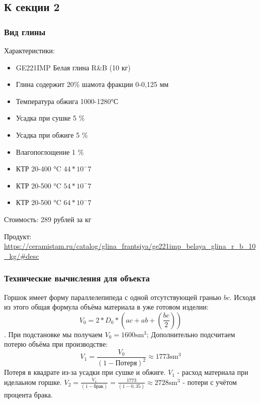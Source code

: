 \documentclass[16pt,a4paper]{article}
\begin{document}
\subsection{К секции 2}
\subsubsection{Вид глины} \label{sec:at1}
Характеристики:
\begin{itemize}
    \item GE221IMP Белая глина R\&B (10 кг)
    \item Глина содержит 20\% шамота фракции 0-0,125 мм
    \item Температура обжига 1000-1280°С
    \item Усадка при сушке     5 \%
    \item Усадка при обжиге    5 \%
    \item Влагопоглощение      1 \%
    \item КТР 20-400 °C         $44*10^-7$
    \item КТР 20-500 °C         $54*10^-7$
    \item КТР 20-500 °C         $64*10^-7$
\end{itemize}
Стоимость: 289 рублей за кг

Продукт: \url{https://ceramistam.ru/catalog/glina_frantsiya/ge221imp_belaya_glina_r_b_10_kg/#desc}
\subsubsection{Технические вычисления для объекта}
\label{sec:at2}
Горшок имеет форму параллелепипеда с одной отсутствующей гранью $bc$. Исходя из этого общая формула объёма материала в уже готовом изделии: $$V_0=2*D_0*(ac+ab+(\frac{bc}{2}))$$.
При подстановке мы получаем $V_0 = 1600 \text{sm}^3$;
Дополнительно подсчитаем потерю объёма при производстве: $$V_1 = \frac{V_0}{(1-\text{Потеря})^2} \approx 1773\text{sm}^3$$
Потеря в квадрате из-за усадки при сушке и обжиге. $V_1$ - расход материала при иделаьном горшке.
$V_2 = \frac{V_1}{(1-\text{брак})}=\frac{1773}{(1-0,35)} \approx 2728\text{sm}^3$ - потери с учётом процента брака.
\end{document}
